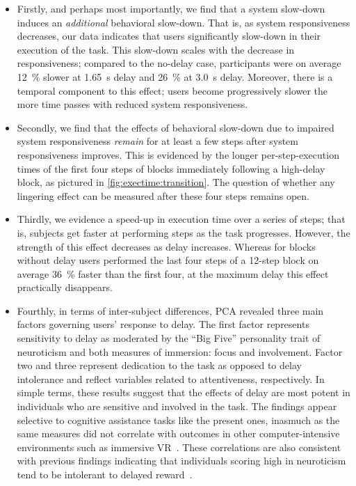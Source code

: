 \documentclass[10pt,letterpaper]{article}
\begin{document}
\begin{itemize}
  \item Firstly, and perhaps most importantly, we find that a system slow-down induces an \textit{additional} behavioral slow-down.
  That is, as system responsiveness decreases, our data indicates that users significantly slow-down in their execution of the task.
  This slow-down scales with the decrease in responsiveness; compared to the no-delay case, participants were on average \SI{12}{\percent} slower at \SI{1.65}{\second} delay and \SI{26}{\percent} at \SI{3.0}{\second} delay.
  Moreover, there is a temporal component to this effect; users become progressively slower the more time passes with reduced system responsiveness.

  \item Secondly, we find that the effects of behavioral slow-down due to impaired system responsiveness \emph{remain} for at least a few steps after system responsiveness improves.
  This is evidenced by the longer per-step-execution times of the first four steps of blocks immediately following a high-delay block, as pictured in \cref{fig:exectime:transition}.
  The question of whether any lingering effect can be measured after these four steps remains open.

  \item Thirdly, we evidence a speed-up in execution time over a series of steps; that is, subjects get faster at performing steps as the task progresses.
  However, the strength of this effect decreases as delay increases.
  Whereas for blocks without delay users performed the last four steps of a 12-step block on average \SI{36}{\percent} faster than the first four, at the maximum delay this effect practically disappears.

  \item Fourthly, in terms of inter-subject differences, PCA revealed three main factors governing users' response to delay. 
  The first factor represents sensitivity to delay as moderated by the ``Big Five'' personality trait of neuroticism and both measures of immersion: focus and involvement.
  Factor two and three represent dedication to the task as opposed to delay intolerance and reflect variables related to attentiveness, respectively.
  In simple terms, these results suggest that the effects of delay are most potent in individuals who are sensitive and involved in the task.
  The findings appear selective to cognitive assistance tasks like the present ones, inasmuch as the same measures did not correlate with outcomes in other computer-intensive environments such as immersive VR~\autocite{quesnel2018you}.
  These correlations are also consistent with previous findings indicating that individuals scoring high in neuroticism tend to be intolerant to delayed reward~\autocite{hirsh2008delay}.
\end{itemize}
\end{document}
